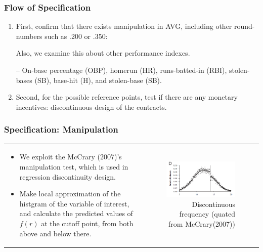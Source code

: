 \documentclass[dvipdfmx,12pt]{beamer}
\begin{document}
\begin{frame}\frametitle{Flow of Specification}
  \begin{enumerate}
    \item First, confirm that there exists manipulation in AVG, including other round-numbers such as .200 or .350:

    Also, we examine this about other performance indexes.

    -- On-base percentage (OBP), homerun (HR), runs-batted-in (RBI), stolen-bases (SB), base-hit (H), and stolen-base (SB).

    \item Second, for the possible reference points, test if there are any monetary incentives: discontinuous design of the contracts.
  \end{enumerate}
\end{frame}

\begin{frame}\frametitle{Specification: Manipulation}

  \begin{tabular}{lr}
    \begin{minipage}[H]{0.45\textwidth}
      \small
      \begin{itemize}
        \item We exploit the McCrary (2007)'s manipulation test, which is used in regression discontinuity design.

        \item Make local approximation of the histgram of the variable of interest, and calculate the predicted values of $f(r)$ at the cutoff point, from both above and below there.
      \end{itemize}
    \end{minipage}
    &
    \begin{minipage}[H]{0.5\textwidth}
      \begin{figure}
        \includegraphics[keepaspectratio, scale = 0.8]{graphs/McCrary_figD.png}
        \caption{Discontinuous frequency (quated from McCrary(2007))}
        \label{McC}
      \end{figure}
    \end{minipage}
  \end{tabular}

\end{frame}
\end{document}
